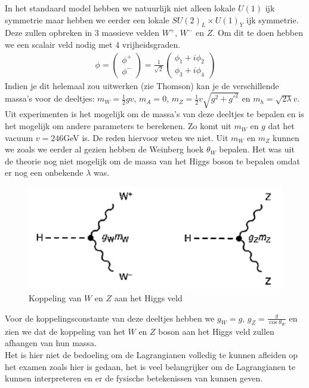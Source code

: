 \documentclass[../main.tex]{subfiles}
\begin{document}
In het standaard model hebben we natuurlijk niet alleen lokale $U(1)$ ijk symmetrie maar hebben we eerder een lokale $SU(2)_L\times U(1)_Y$ ijk symmetrie. Deze zullen opbreken in 3 massieve velden $W^+$, $W^-$ en $Z$. Om dit te doen hebben we een scalair veld nodig met 4 vrijheidsgraden.
\begin{equation}
    \begin{aligned}
        \label{eq:sm_scalair_veld}
        \phi = 
        \begin{pmatrix}
            \phi^+\\
            \phi^-
        \end{pmatrix}
        = \frac{1}{\sqrt{2}} 
        \begin{pmatrix}
            \phi_1 + i\phi_2\\
            \phi_3 + i\phi_4
        \end{pmatrix}
    \end{aligned}
\end{equation}
Indien je dit helemaal zou uitwerken (zie Thomson) kan je de verschillende massa's voor de deeltjes: $m_W = \frac{1}{2} gv$, $m_A = 0$, $m_Z = \frac{1}{2} v\sqrt{g^2+g'^2}$ en $m_h = \sqrt{2\lambda}v$. Uit experimenten is het mogelijk om de massa's van deze deeltjes te bepalen en is het mogelijk om andere parameters te berekenen. Zo komt uit $m_W$ en $g$ dat het vacuum $v=246$GeV is. De reden hiervoor weten we niet. Uit $m_W$ en $m_Z$ kunnen we zoals we eerder al gezien hebben de Weinberg hoek $\theta_W$ bepalen. Het was uit de theorie nog niet mogelijk om de massa van het Higgs boson te bepalen omdat er nog een onbekende $\lambda$ was.

\begin{figure}[h]
    \centering
    \includegraphics[width=0.6\linewidth]{higgs_boson/koppeling_higgs_wz_boson.png}
    \caption{Koppeling van $W$ en $Z$ aan het Higgs veld}%
    \label{fig:higgs_boson/koppeling_higgs_wz_boson}
\end{figure}

Voor de koppelingsconstante van deze deeltjes hebben we $g_W=g$, $g_Z= \frac{g}{\cos\theta_W}$ en zien we dat de koppeling van het $W$ en $Z$ boson aan het Higgs veld zullen afhangen van hun massa.\\
{\color{red} Het is hier niet de bedoeling om de Lagrangianen volledig te kunnen afleiden op het examen zoals hier is gedaan, het is veel belangrijker om de Lagrangianen te kunnen interpreteren en er de fysische betekenissen van kunnen geven.}
\end{document}
